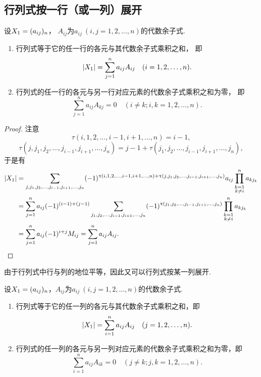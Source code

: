 \subsection{行列式按一行（或一列）展开}
\begin{theorem}\label{theorem:行列式.行列式按行展开}
设\(X_1=(a_{ij})_n\)，
\(A_{ij}\)为\(a_{ij}\ (i,j=1,2,\dotsc,n)\)的代数余子式.
\begin{enumerate}
	\item 行列式等于它的任一行的各元与其代数余子式乘积之和，
	即\begin{equation}
		\abs{X_1} = \sum_{j=1}^n a_{ij} A_{ij}
		\quad(i=1,2,\dotsc,n).
	\end{equation}

	\item 行列式的任一行的各元与另一行对应元素的代数余子式乘积之和为零，
	即\begin{equation}
		\sum_{j=1}^n a_{ij} A_{kj} = 0
		\quad(i \neq k;
		i,k=1,2,\dotsc,n).
	\end{equation}
\end{enumerate}
\begin{proof}
注意\[
	\tau(i,1,2,\dotsc,i-1,i+1,\dotsc,n) = i-1,
\]\[
	\tau(j,j_1,j_2,\dotsc,j_{i-1},j_{i+1},\dotsc,j_n)
	= j-1+\tau(j_1,j_2,\dotsc,j_{i-1},j_{i+1},\dotsc,j_n),
\]于是有\begin{align*}
	\abs{X_1}
	&= \sum_{j,j_1,j_2,\dotsc,j_{i-1},j_{i+1},\dotsc,j_n}
		(-1)^{\uptau(i,1,2,\dotsc,i-1,i+1,\dotsc,n) + \uptau(j,j_1,j_2,\dotsc,j_{i-1},j_{i+1},\dotsc,j_n)}
		a_{ij} \prod_{\substack{k=1 \\ k \neq i}}^n a_{k j_k} \\
	&= \sum_{j=1}^n a_{ij} (-1)^{(i-1)+(j-1)}
		\sum_{j_1,j_2,\dotsc,j_{i-1},j_{i+1},\dotsc,j_n}
			(-1)^{\uptau(j_1,j_2,\dotsc,j_{i-1},j_{i+1},\dotsc,j_n)}
				\prod_{\substack{k=1 \\ k \neq i}}^n a_{k j_k} \\
	&= \sum_{j=1}^n a_{ij} (-1)^{i+j} M_{ij}
	= \sum_{j=1}^n a_{ij} A_{ij}.
	\qedhere
\end{align*}
\end{proof}
\end{theorem}

由于行列式中行与列的地位平等，因此又可以行列式按某一列展开.
\begin{theorem}
设\(X_1=(a_{ij})_n\)，\(A_{ij}\)为\(a_{ij}\ (i,j=1,2,\dotsc,n)\)的代数余子式.
\begin{enumerate}
	\item 行列式等于它的任一列的各元与其代数余子式乘积之和，即\begin{equation}
		\abs{X_1} = \sum_{i=1}^n a_{ij} A_{ij}
		\quad(j=1,2,\dotsc,n).
	\end{equation}

	\item 行列式的任一列的各元与另一列对应元素的代数余子式乘积之和为零，即\begin{equation}
		\sum_{i=1}^n a_{ij} A_{ik} = 0
		\quad(j \neq k;
		j,k=1,2,\dotsc,n).
	\end{equation}
\end{enumerate}
\end{theorem}

